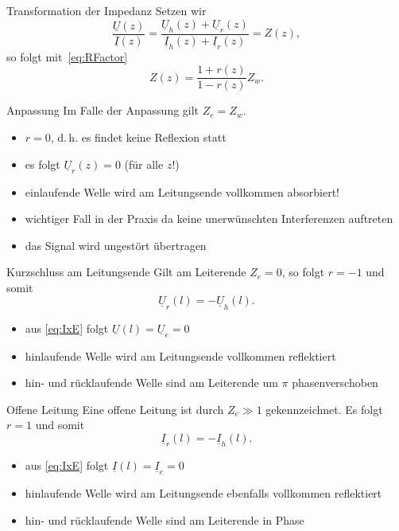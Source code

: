 \documentclass{beamer}
\begin{document}
\begin{frame}{Transformation der Impedanz}
Setzen wir
\[
\frac{\underline{U}(z)}{\underline{I}(z)}
= \frac{\underline{U}_{h}(z) +
\underline{U}_{r}(z)}{\underline{I}_{h}(z) +
    \underline{I}_{r}(z)} = Z(z),
\]
so folgt mit~\eqref{eq:RFactor}
\[
Z(z) = \frac{1 + r(z)}{1 - r(z)} Z_{w}.
\]
\end{frame}


\begin{frame}{Anpassung}
Im Falle der Anpassung gilt $Z_{e} = Z_{w}$.
\begin{itemize}
    \item <1-> $r = 0$, d.\,h. es findet keine Reflexion statt
    \item <2-> es folgt $\underline{U}_{r}(z) = 0$ (für \alert{alle} $z$!)
    \item <3-> einlaufende Welle wird am Leitungsende vollkommen absorbiert!
    \item <4-> wichtiger Fall in der Praxis da keine unerwünschten Interferenzen auftreten
    \item <5-> das Signal wird ungestört übertragen
\end{itemize}
\end{frame}


\begin{frame}{Kurzschluss am Leitungsende}
Gilt am Leiterende $Z_{e} = 0$, so folgt $r = -1$ und somit
\[
\underline{U}_{r}(l) = - \underline{U}_{h}(l).
\]

\begin{itemize}
    \item<2-> aus \eqref{eq:IxE} folgt $\underline{U}(l) = \underline{U}_{e} = 0$
    \item<3-> hinlaufende Welle wird am Leitungsende vollkommen reflektiert
    \item<4-> hin- und rücklaufende Welle sind am Leiterende um $\pi$ phasenverschoben
\end{itemize}

\end{frame}


\begin{frame}{Offene Leitung}
Eine offene Leitung ist durch $Z_{e} \gg 1$ gekennzeichnet. Es folgt $r = 1$ und somit
\[
\underline{I}_{r}(l) = - \underline{I}_{h}(l).
\]

\begin{itemize}
    \item<2-> aus \eqref{eq:IxE} folgt $\underline{I}(l) = \underline{I}_{e} = 0$
    \item<3-> hinlaufende Welle wird am Leitungsende ebenfalls vollkommen reflektiert
    \item<4-> hin- und rücklaufende Welle sind am Leiterende in Phase
\end{itemize}

\end{frame}
\end{document}
